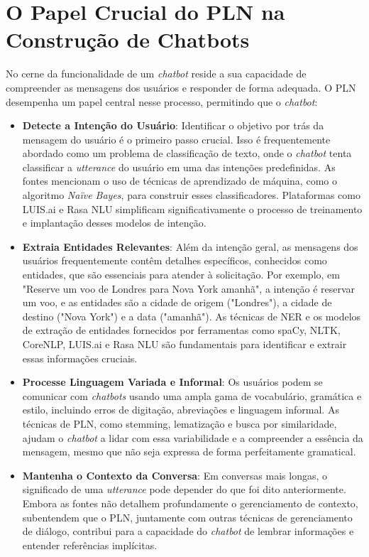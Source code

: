 \documentclass[14pt,a4paper,oneside]{book}
\begin{document}
\section{O Papel Crucial do PLN na Construção de Chatbots}

No cerne da funcionalidade de um \textit{chatbot} reside a sua capacidade de compreender as mensagens dos usuários e responder de forma adequada. O PLN desempenha um papel central nesse processo, permitindo que o \textit{chatbot}:

\begin{itemize}
    \item \textbf{Detecte a Intenção do Usuário}: Identificar o objetivo por trás da mensagem do usuário é o primeiro passo crucial. Isso é frequentemente abordado como um problema de classificação de texto, onde o \textit{chatbot} tenta classificar a \textit{utterance} do usuário em uma das intenções predefinidas. As fontes mencionam o uso de técnicas de aprendizado de máquina, como o algoritmo \textit{Naïve Bayes}, para construir esses classificadores. Plataformas como LUIS.ai e Rasa NLU simplificam significativamente o processo de treinamento e implantação desses modelos de intenção.
    \item \textbf{Extraia Entidades Relevantes}: Além da intenção geral, as mensagens dos usuários frequentemente contêm detalhes específicos, conhecidos como entidades, que são essenciais para atender à solicitação. Por exemplo, em "Reserve um voo de Londres para Nova York amanhã", a intenção é reservar um voo, e as entidades são a cidade de origem ("Londres"), a cidade de destino ("Nova York") e a data ("amanhã"). As técnicas de NER e os modelos de extração de entidades fornecidos por ferramentas como spaCy, NLTK, CoreNLP, LUIS.ai e Rasa NLU são fundamentais para identificar e extrair essas informações cruciais.
    \item \textbf{Processe Linguagem Variada e Informal}: Os usuários podem se comunicar com \textit{chatbots} usando uma ampla gama de vocabulário, gramática e estilo, incluindo erros de digitação, abreviações e linguagem informal. As técnicas de PLN, como stemming, lematização e busca por similaridade, ajudam o \textit{chatbot} a lidar com essa variabilidade e a compreender a essência da mensagem, mesmo que não seja expressa de forma perfeitamente gramatical.
    \item \textbf{Mantenha o Contexto da Conversa}: Em conversas mais longas, o significado de uma \textit{utterance} pode depender do que foi dito anteriormente. Embora as fontes não detalhem profundamente o gerenciamento de contexto, subentendem que o PLN, juntamente com outras técnicas de gerenciamento de diálogo, contribui para a capacidade do \textit{chatbot} de lembrar informações e entender referências implícitas.
\end{itemize}
\end{document}
